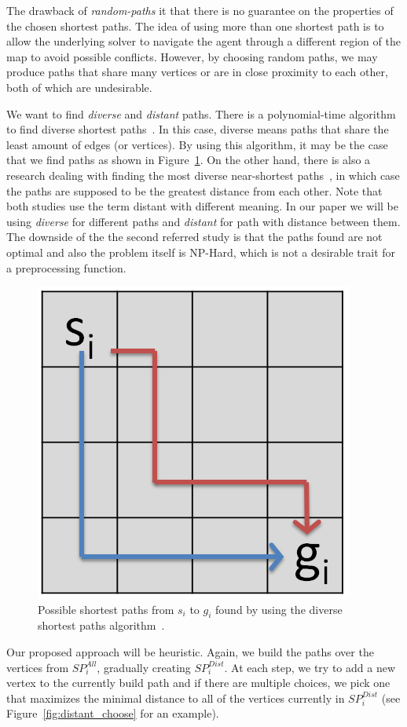 %
The drawback of \emph{random-paths} it that there is no guarantee on the properties of the chosen shortest paths. The idea of using more than one shortest path is to allow the underlying solver to navigate the agent through a different region of the map to avoid possible conflicts. However, by choosing random paths, we may produce paths that share many vertices or are in close proximity to each other, both of which are undesirable.

We want to find \emph{diverse} and \emph{distant} paths. There is a polynomial-time algorithm to find diverse shortest paths~\cite{diverse}. In this case, diverse means paths that share the least amount of edges (or vertices). By using this algorithm, it may be the case that we find paths as shown in Figure~\ref{fig:diverse}. On the other hand, there is also a research dealing with finding the most diverse near-shortest paths~\cite{distant}, in which case the paths are supposed to be the greatest distance from each other. Note that both studies use the term distant with different meaning. In our paper we will be using \emph{diverse} for different paths and \emph{distant} for path with distance between them. The downside of the the second referred study is that the paths found are not optimal and also the problem itself is NP-Hard, which is not a desirable trait for a preprocessing function.

\begin{figure}[hb]
\centering
\includegraphics[width=0.25\columnwidth]{img/diverse.PNG}
\caption{Possible shortest paths from $s_i$ to $g_i$ found by using the diverse shortest paths algorithm~\cite{diverse}.}
\label{fig:diverse}
\end{figure}


Our proposed approach will be heuristic. Again, we build the paths over the vertices from $SP_i^{All}$, gradually creating $SP_i^{Dist}$. At each step, we try to add a new vertex to the currently build path and if there are multiple choices, we pick one that maximizes the minimal distance to all of the vertices currently in $SP_i^{Dist}$ (see Figure~\ref{fig:distant_choose} for an example).

